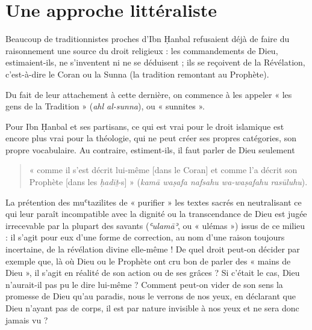 \hypertarget{une-approche-littuxe9raliste}{%
\section{Une approche littéraliste}\label{une-approche-littuxe9raliste}}


Beaucoup de traditionnistes proches d'Ibn Ḥanbal refusaient déjà de
faire du raisonnement une source du droit religieux : les commandements
de Dieu, estimaient-ils, ne s'inventent ni ne se déduisent ; ils se
reçoivent de la Révélation, c'est-à-dire le Coran ou la Sunna (la
tradition remontant au Prophète). 
\begin{Def}[sunnisme]
Du fait de leur attachement à cette
dernière, on commence à les appeler « les gens de la Tradition »
(\emph{ahl al-sunna}), ou « sunnites ».
\end{Def}
 Pour Ibn Ḥanbal et ses
partisans, ce qui est vrai pour le droit islamique est encore plus vrai
pour la théologie, qui ne peut créer ses propres catégories, son propre
vocabulaire. Au contraire, estiment-ils, il faut parler de Dieu
seulement
\begin{quote}
    « comme il s'est décrit lui-même {[}dans le Coran{]}
et comme l'a décrit son Prophète {[}dans les \emph{ḥadīṯ}-s{]} »
(\emph{kamā waṣafa nafsahu wa-waṣafahu}
\emph{rasūluhu}).
\end{quote}

La prétention des muʿtazilites de « purifier » les textes sacrés en
neutralisant ce qui leur paraît incompatible avec la dignité ou la
transcendance de Dieu est jugée irrecevable par la plupart des savants
(\emph{ʿulamāʾ}, ou « ulémas ») issus de ce milieu : il s'agit pour eux
d'une forme de correction, au nom d'une raison toujours incertaine, de
la révélation divine elle-même ! De quel droit peut-on décider par
exemple que, là où Dieu ou le Prophète ont cru bon de parler des « mains
de Dieu », il s'agit en réalité de son action ou de ses grâces ? Si
c'était le cas, Dieu n'aurait-il pas pu le dire lui-même ? Comment
peut-on vider de son sens la promesse de Dieu qu'au paradis, nous le
verrons de nos yeux, en déclarant que Dieu n'ayant pas de corps, il est
par nature invisible à nos yeux et ne sera donc jamais vu ?


